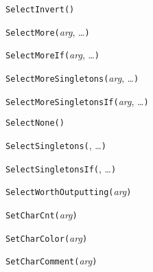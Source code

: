 \texttt{SelectInvert(}\texttt{)}



\texttt{SelectMore(}\textit{arg}, \ldots\texttt{)}



\texttt{SelectMoreIf(}\textit{arg}, \ldots\texttt{)}



\texttt{SelectMoreSingletons(}\textit{arg}, \ldots\texttt{)}



\texttt{SelectMoreSingletonsIf(}\textit{arg}, \ldots\texttt{)}



\texttt{SelectNone(}\texttt{)}



\texttt{SelectSingletons(}, \ldots\texttt{)}



\texttt{SelectSingletonsIf(}, \ldots\texttt{)}



\texttt{SelectWorthOutputting(}\textit{arg}\texttt{)}



\texttt{SetCharCnt(}\textit{arg}\texttt{)}



\texttt{SetCharColor(}\textit{arg}\texttt{)}



\texttt{SetCharComment(}\textit{arg}\texttt{)}

